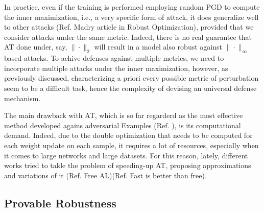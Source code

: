 \documentclass[LaM,binding=0.6cm]{./packages/sapthesis/sapthesis}
\begin{document}
                In practice, even if the training is performed employing random PGD to compute the inner maximization,
                i.e., a very specific form of attack, it does generalize well to other attacks (Ref. Madry article in Robust Optimization), 
                provided that we consider attacks under the same metric. Indeed, there is no real guarantee that AT
                done under, say, $\|\cdot\|_2$ will result in a model also robust against $\|\cdot\|_{\infty}$ based 
                attacks. To achive defenses against multiple metrics, we need to incorporate multiple attacks under the inner maximization,
                however, as previously discussed, characterizing a priori every possible metric of perturbation seem to be 
                a difficult task, hence the complexity of devising an universal defense mechanism.

                The main drawback with AT, which is so far regarderd as the most effective method developed agains adversarial
                Examples (Ref. ), is its computational demand. Indeed, due to the double optimization that needs to be
                computed for each weight update on each sample, it requires a lot of resources, especially when it comes
                to large networks and large datasets. For this reason, lately, different works tried to takle the
                problem of speeding-up AT, proposing approximations and variations of it (Ref. Free AL)(Ref. Fast is better than free).

                
            
            \subsection{Provable Robustness}
\end{document}
